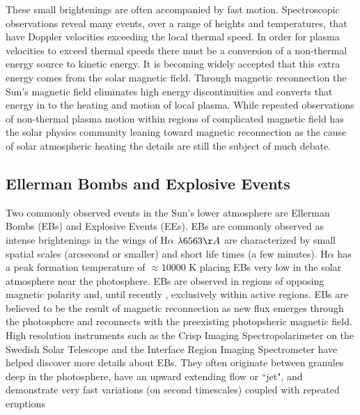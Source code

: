 \documentclass[]{aastex6}
\begin{document}
	These small brightenings are often accompanied by fast motion.  Spectroscopic observations reveal many events, over a range of heights and temperatures, that have Doppler velocities exceeding the local thermal speed.  In order for plasma velocities to exceed  thermal speeds there must be a conversion of a non-thermal energy source to kinetic energy. It is becoming widely accepted that this extra energy comes from the solar magnetic field.  Through magnetic reconnection the Sun's magnetic field eliminates high energy discontinuities and converts that energy in to the heating and motion of local plasma.  While repeated observations of non-thermal plasma motion within regions of complicated magnetic field has the solar physics community leaning toward magnetic reconnection as the cause of solar atmospheric heating the details are still the subject of much debate.	

	\subsection{Ellerman Bombs and Explosive Events}
	
	Two commonly observed events in the Sun's lower atmosphere are Ellerman Bombs (EBs) and Explosive Events (EEs). EBs \citep{Ellerman1917} are commonly observed as intense brightenings in the wings of H$\alpha$ $\lambda 6563 \AA $ are characterized by small spatial scales (arcsecond or smaller) and short life times (a few minutes). H$\alpha$ has a peak formation temperature of $\approx 10000$ K placing EBs very low in the solar atmosphere near the photosphere. EBs are observed in regions of opposing magnetic polarity and, until recently \citep{Nelson2017}, exclusively within active regions.  EBs are believed to be the result of magnetic reconnection as new flux emerges through the photosphere and reconnects with the preexisting photopsheric magnetic field.  High resolution instruments such as the Crisp Imaging Spectropolarimeter \citep[CHRISP;][]{CHRISP} on the Swedish Solar Telescope \citep[SST;][]{SST} and the Interface Region Imaging Spectrometer \citep[IRIS;][]{IRIS} have helped discover more details about EBs.  They often originate between granules deep in the photosphere, have an upward extending flow or ``jet", and demonstrate very fast variations (on second timescales) coupled with repeated eruptions \citep{Watanabe2011,Vissers2013,Vissers2015}
	
\end{document}
